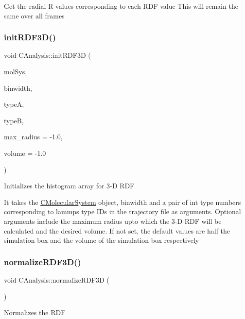 Get the radial R values corresponding to each R\+DF value This will remain the same over all frames \mbox{\label{classCAnalysis_a9de7483ee6245d5b44270b103d82c923}} 
\subsubsection{\texorpdfstring{init\+R\+D\+F3\+D()}{initRDF3D()}}
{\footnotesize\ttfamily void C\+Analysis\+::init\+R\+D\+F3D (\begin{DoxyParamCaption}\item[{class \mbox{\hyperlink{classCMolecularSystem}{C\+Molecular\+System}} \&}]{mol\+Sys,  }\item[{double}]{binwidth,  }\item[{int}]{typeA,  }\item[{int}]{typeB,  }\item[{double}]{max\+\_\+radius = {\ttfamily -\/1.0},  }\item[{double}]{volume = {\ttfamily -\/1.0} }\end{DoxyParamCaption})}

Initializes the histogram array for 3-\/D R\+DF

It takes the \mbox{\hyperlink{classCMolecularSystem}{C\+Molecular\+System}} object, binwidth and a pair of int type numbers corresponding to lammps type I\+Ds in the trajectory file as arguments. Optional arguments include the maximum radius upto which the 3-\/D R\+DF will be calculated and the desired volume. If not set, the default values are half the simulation box and the volume of the simulation box respectively \mbox{\label{classCAnalysis_a1716c9da84e9d41cbb32b97f7708e9f7}} 
\subsubsection{\texorpdfstring{normalize\+R\+D\+F3\+D()}{normalizeRDF3D()}}
{\footnotesize\ttfamily void C\+Analysis\+::normalize\+R\+D\+F3D (\begin{DoxyParamCaption}{ }\end{DoxyParamCaption})}

Normalizes the R\+DF

